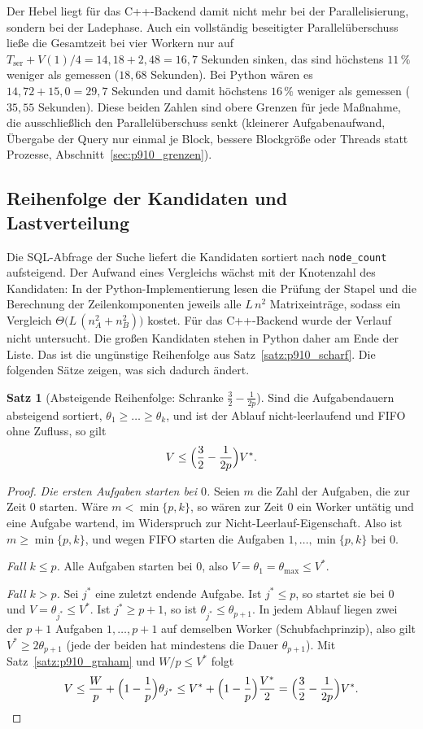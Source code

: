 \documentclass[a4paper,12pt, twoside]{report}
\theoremstyle{definition}
\newtheorem{satz}{Satz}
\begin{document}
Der Hebel liegt für das C++-Backend damit nicht mehr bei der Parallelisierung, sondern bei der Ladephase. Auch ein vollständig beseitigter Parallelüberschuss ließe die Gesamtzeit bei vier Workern nur auf $T_{\mathrm{ser}}+V(1)/4=14{,}18+2{,}48=16{,}7$ Sekunden sinken, das sind höchstens $11\,\%$ weniger als gemessen ($18{,}68$ Sekunden). Bei Python wären es $14{,}72+15{,}0=29{,}7$ Sekunden und damit höchstens $16\,\%$ weniger als gemessen ($35{,}55$ Sekunden). Diese beiden Zahlen sind obere Grenzen für jede Maßnahme, die ausschließlich den Parallelüberschuss senkt (kleinerer Aufgabenaufwand, Übergabe der Query nur einmal je Block, bessere Blockgröße oder Threads statt Prozesse, Abschnitt~\ref{sec:p910_grenzen}).

\subsection{Reihenfolge der Kandidaten und Lastverteilung}
\label{sec:p910_reihenfolge}

Die SQL-Abfrage der Suche liefert die Kandidaten sortiert nach \texttt{node\_count} aufsteigend. Der Aufwand eines Vergleichs wächst mit der Knotenzahl des Kandidaten: In der Python-Implementierung lesen die Prüfung der Stapel und die Berechnung der Zeilenkomponenten jeweils alle $L\,n^2$ Matrixeinträge, sodass ein Vergleich $\Theta\bigl(L\,(n_A^2+n_B^2)\bigr)$ kostet. Für das C++-Backend wurde der Verlauf nicht untersucht. Die großen Kandidaten stehen in Python daher am Ende der Liste. Das ist die ungünstige Reihenfolge aus Satz~\ref{satz:p910_scharf}. Die folgenden Sätze zeigen, was sich dadurch ändert.

\begin{satz}[Absteigende Reihenfolge: Schranke $\tfrac32-\tfrac1{2p}$]
\label{satz:p910_lpt}
Sind die Aufgabendauern absteigend sortiert, $\theta_1\ge\dots\ge\theta_k$, und ist der Ablauf nicht-leerlaufend und FIFO ohne Zufluss, so gilt
\[
V\le\Bigl(\frac32-\frac1{2p}\Bigr)V^\ast .
\]
\end{satz}

\begin{proof}
\emph{Die ersten Aufgaben starten bei $0$.} Seien $m$ die Zahl der Aufgaben, die zur Zeit $0$ starten. Wäre $m<\min\{p,k\}$, so wären zur Zeit $0$ ein Worker untätig und eine Aufgabe wartend, im Widerspruch zur Nicht-Leerlauf-Eigenschaft. Also ist $m\ge\min\{p,k\}$, und wegen FIFO starten die Aufgaben $1,\dots,\min\{p,k\}$ bei $0$.

\emph{Fall $k\le p$.} Alle Aufgaben starten bei $0$, also $V=\theta_1=\theta_{\max}\le V^\ast$.

\emph{Fall $k>p$.} Sei $j^\ast$ eine zuletzt endende Aufgabe. Ist $j^\ast\le p$, so startet sie bei $0$ und $V=\theta_{j^\ast}\le V^\ast$. Ist $j^\ast\ge p+1$, so ist $\theta_{j^\ast}\le\theta_{p+1}$. In jedem Ablauf liegen zwei der $p+1$ Aufgaben $1,\dots,p+1$ auf demselben Worker (Schubfachprinzip), also gilt $V^\ast\ge 2\theta_{p+1}$ (jede der beiden hat mindestens die Dauer $\theta_{p+1}$). Mit Satz~\ref{satz:p910_graham} und $W/p\le V^\ast$ folgt
\[
V\le\frac Wp+\Bigl(1-\frac1p\Bigr)\theta_{j^\ast}\le V^\ast+\Bigl(1-\frac1p\Bigr)\frac{V^\ast}2=\Bigl(\frac32-\frac1{2p}\Bigr)V^\ast.\qedhere
\]
\end{proof}
\end{document}
